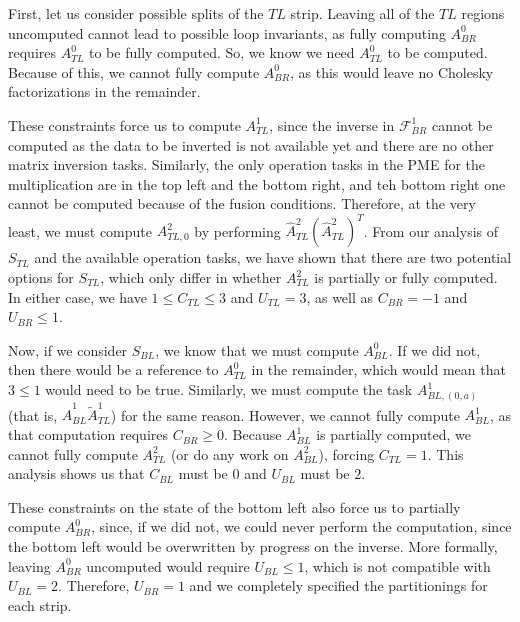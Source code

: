 \documentclass[12pt,letterpaper]{article}
\newcommand*{\opF}{\mathcal{F}}
\begin{document}
First, let us consider possible splits of the $TL$ strip.
Leaving all of the $TL$ regions uncomputed cannot lead to possible loop invariants, as fully computing $A_{BR}^0$ requires $A_{TL}^0$ to be fully computed.
So, we know we need $A_{TL}^0$ to be computed.
Because of this, we cannot fully compute $A_{BR}^0$, as this would leave no Cholesky factorizations in the remainder.

These constraints force us to compute $A_{TL}^1$, since the inverse in $\opF_{BR}^1$ cannot be computed as the data to be inverted is not available yet and there are no other matrix inversion tasks.
Similarly, the only operation tasks in the PME for the multiplication are in the top left and the bottom right, and teh bottom right one cannot be computed because of the fusion conditions.
Therefore, at the very least, we must compute $A_{TL, 0}^2$ by performing $\hat{A}^2_{TL}(\hat{A}^2_{TL})^T$.
From our analysis of $S_{TL}$ and the available operation tasks, we have shown that there are two potential options for $S_{TL}$, which only differ in whether $A_{TL}^2$ is partially or fully computed.
In either case, we have $1 \leq C_{TL} \leq 3$ and $U_{TL} = 3$, as well as $C_{BR} = -1$ and $U_{BR} \leq 1$.

Now, if we consider $S_{BL}$, we know that we must compute $A_{BL}^0$.
If we did not, then there would be a reference to $A_{TL}^0$ in the remainder, which would mean that $3 \leq 1$ would need to be true.
Similarly, we must compute the task $A_{BL, (0, a)}^1$ (that is, $\hat{A}_{BL}^1\widetilde{A}_{TL}^1$) for the same reason.
However, we cannot fully compute $A^1_{BL}$, as that computation requires $C_{BR} \geq 0$.
Because $A^1_{BL}$ is partially computed, we cannot fully compute $A_{TL}^2$ (or do any work on $A_{BL}^2$), forcing $C_{TL} = 1$.
This analysis shows us that $C_{BL}$ must be $0$ and $U_{BL}$ must be $2$.

These constraints on the state of the bottom left also force us to partially compute $A_{BR}^0$, since, if we did not, we could never perform the computation, since the bottom left would be overwritten by progress on the inverse.
More formally, leaving $A_{BR}^0$ uncomputed would require $U_{BL} \leq 1$, which is not compatible with $U_{BL} = 2$.
Therefore, $U_{BR} = 1$ and we completely specified the partitionings for each strip.
\end{document}
